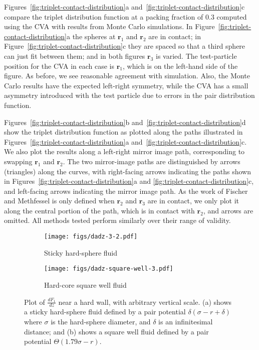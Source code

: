 \documentclass[letterpaper,twocolumn,amsmath,amssymb,pre,aps,10pt]{revtex4-1}
\newcommand{\rr}{\textbf{r}}
\begin{document}
Figures~\ref{fig:triplet-contact-distribution}a
and~\ref{fig:triplet-contact-distribution}c compare the triplet
distribution function at a packing fraction of 0.3 computed using the
CVA with results from Monte Carlo simulations. In
Figure~\ref{fig:triplet-contact-distribution}a the spheres at $\rr_1$
and $\rr_2$ are in contact; in
Figure~\ref{fig:triplet-contact-distribution}c they are spaced so that
a third sphere can just fit between them; and in both figures $\rr_3$
is varied. The test-particle position for the CVA in each case is
$\rr_1$, which is on the left-hand side of the figure. As before, we
see reasonable agreement with simulation. Also, the Monte Carlo
results have the expected left-right symmetry, while the CVA has a
small asymmetry introduced with the test particle due to errors in the
pair distribution function.

Figures~\ref{fig:triplet-contact-distribution}b
and~\ref{fig:triplet-contact-distribution}d show the triplet
distribution function as plotted along the paths illustrated in
Figures~\ref{fig:triplet-contact-distribution}a
and~\ref{fig:triplet-contact-distribution}c.  We also plot the
results along a left-right mirror image path, corresponding to
swapping $\rr_1$ and $\rr_2$. The two mirror-image paths are
distinguished by arrows (triangles) along the curves, with right-facing arrows
indicating the paths shown in
Figures~\ref{fig:triplet-contact-distribution}a and
\ref{fig:triplet-contact-distribution}c, and left-facing arrows
indicating the mirror image path.  As the work of
Fischer and Methfessel is only defined when $\rr_2$ and $\rr_3$ are in
contact, we only plot it along the
central portion of the path, which is in contact with $\rr_2$, and arrows
are omitted.
%
All methods tested perform similarly over their range of validity.

\begin{figure}
  \begin{subfigure}{1.0\columnwidth}
    \texttt{[image: figs/dadz-3-2.pdf]}
    \vspace{-0.8cm}
    \caption{Sticky hard-sphere fluid}\label{fig:dadz-delta}
  \end{subfigure}
  \begin{subfigure}{1.0\columnwidth}
    \texttt{[image: figs/dadz-square-well-3.pdf]}
    \vspace{-0.8cm}
    \caption{Hard-core square well fluid}\label{fig:dadz-square-well}
  \end{subfigure}
  \caption{Plot of $\frac{dF_1}{dz}$ near a hard wall, with arbitrary
    vertical scale.  (a) shows a
    sticky hard-sphere fluid defined by a pair potential
    $\delta(\sigma-r+\delta)$ where $\sigma$ is the hard-sphere
    diameter, and $\delta$ is an infinitesimal distance; and (b) shows a
    square well fluid defined by a pair potential $\Theta(1.79
    \sigma-r)$.
  }
  \label{fig:dadz}
\end{figure}
\end{document}
